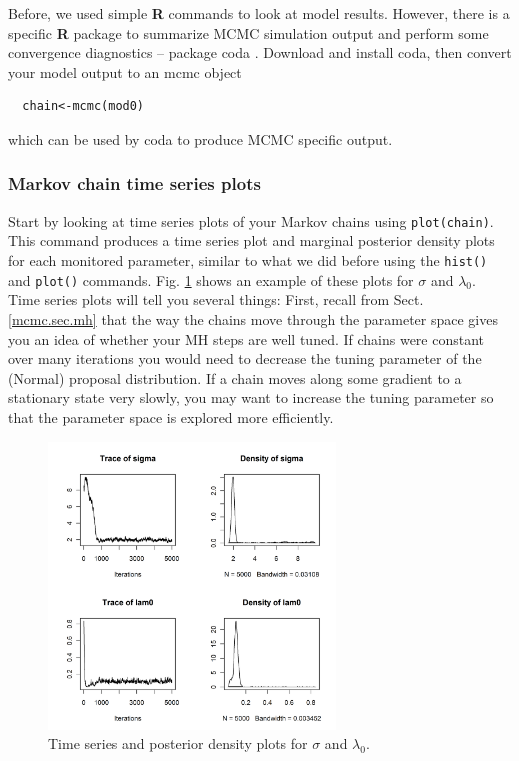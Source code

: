 Before, we used simple {\bf R} commands to look at model results. 
However, there is a specific {\bf R} package to summarize MCMC 
simulation output and perform some convergence diagnostics -- package 
coda \citep{plummer_etal:2006}. Download and install coda, then 
convert your model output to an mcmc object
\begin{verbatim}
  chain<-mcmc(mod0)
\end{verbatim} 
which can be used by coda to produce MCMC specific output.

\subsubsection{Markov chain time series plots}

Start by looking at time series plots of your Markov chains using 
\verb#plot(chain)#. This command produces a time series plot and
 marginal posterior density plots for each monitored parameter, 
 similar to what we did before using the \verb#hist()# and \verb#plot()# 
 commands. Fig. \ref{mcmc.fig.timeseries} shows an example of these plots for $\sigma$ and $\lambda_0$. Time series plots will tell 
 you several things:
First, recall from Sect. \ref{mcmc.sec.mh} that the way the chains move 
through the parameter space gives you an idea of whether your MH 
steps are well tuned. If chains were constant over many iterations 
you would need to decrease the tuning parameter of the (Normal) 
proposal distribution. If a chain moves along some gradient to a 
stationary state very slowly, you may want to increase the tuning 
parameter so that the parameter space is explored more efficiently.


\begin{figure}
\begin{center}
\includegraphics[height=3in]{Ch7/figs/timeseries}
\end{center}
\caption{Time series and posterior density plots for $\sigma$ and $\lambda_0$.}
\label{mcmc.fig.timeseries}
\end{figure}


